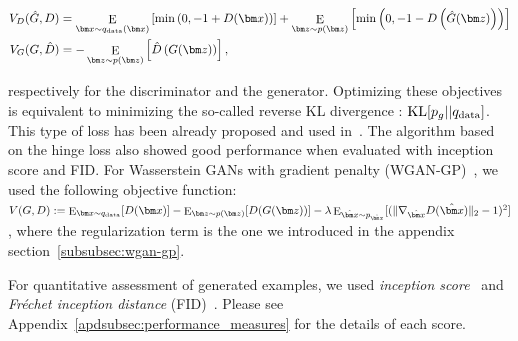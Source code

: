 \begin{align}
	 V_D(\hat{G}, D) &= \mathop{\mathrm{E}}_{{\bm x}\sim q_{\rm data}({\bm x})}\left[{\rm min}\left(0, -1+D({\bm x})\right)\right] + \mathop{\mathrm{E}}_{{\bm z}\sim p({\bm z})} \left[{\rm min}\left(0, -1-D\left(\hat{G}({\bm z})\right)\right)\right]\\
     V_G(G, \hat{D}) &= -\mathop{\mathrm{E}}_{{\bm z}\sim p({\bm z})}\left[\hat{D}\left(G({\bm z})\right)\right], \label{eq:hinge}
\end{align}

respectively for the discriminator and the generator. Optimizing these objectives is equivalent to minimizing the so-called reverse KL divergence : ${\rm KL}[p_g||q_{\rm data}]$. This type of loss has been already proposed and used in~\cite{lim2017geometric, tran2017deep}. The algorithm based on the hinge loss also showed good performance when evaluated with inception score and FID. For Wasserstein GANs with gradient penalty (WGAN-GP)~\cite[]{gulrajani2017improved}, we used the following objective function: $V(G, D) := \mathop{\mathrm{E}}_{{\bm x} \sim q_{\rm data}} [ D({\bm x})] -  \mathop{\mathrm{E}}_{{\bm z}\sim p({\bm z})} [D(G({\bm z}))] - \lambda \mathop{\mathrm{E}}_{\hat{{\bm x}} \sim p_{\hat{{\bm x}}}}[(\|\nabla_{\hat{{\bm x}}}D(\hat{{\bm x}})\|_2-1)^2] \label{eq:wgan_gp}$,
where the regularization term is the one we introduced in the appendix section~\ref{subsubsec:wgan-gp}.

For quantitative assessment of generated examples, we used \textit{inception score}~\cite[]{salimans2016improved} and \textit{Fr\'echet inception distance} (FID)~\cite[]{heusel2017gans}.
Please see Appendix~\ref{apdsubsec:performance_measures} for the details of each score.

